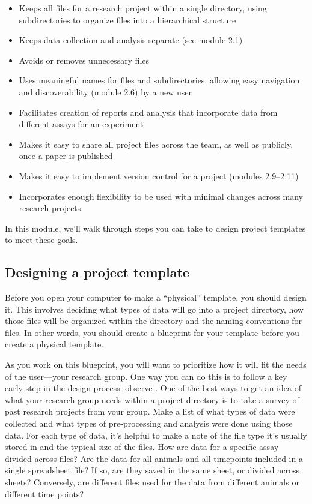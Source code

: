 \documentclass[]{tufte-book}
\providecommand{\tightlist}{%
  \setlength{\itemsep}{0pt}\setlength{\parskip}{0pt}}
\begin{document}
\begin{itemize}
\tightlist
\item
  Keeps all files for a research project within a single directory, using
  subdirectories to organize files into a hierarchical structure
\item
  Keeps data collection and analysis separate (see module 2.1)
\item
  Avoids or removes unnecessary files
\item
  Uses meaningful names for files and subdirectories, allowing easy navigation
  and discoverability (module 2.6) by a new user
\item
  Facilitates creation of reports and analysis that incorporate data from
  different assays for an experiment
\item
  Makes it easy to share all project files across the team, as well as
  publicly, once a paper is published
\item
  Makes it easy to implement version control for a project (modules 2.9--2.11)
\item
  Incorporates enough flexibility to be used with minimal changes across many
  research projects
\end{itemize}

In this module, we'll walk through steps you can take to design project
templates to meet these goals.

\subsection{Designing a project template}\label{designing-a-project-template}

Before you open your computer to make a ``physical'' template, you should design
it. This involves deciding what types of data will go into a project directory,
how those files will be organized within the directory and the naming conventions
for files. In other words, you should create a blueprint for
your template before you create a physical template.

As you work on this blueprint, you will want to prioritize how it will fit the
needs of the user---your research group. One way you can do this is to follow a
key early step in the design process: observe \citep{osann2020design}. One of the
best ways to get an idea of what your research group needs within a project
directory is to take a survey of past research projects from your group. Make a
list of what types of data were collected and what types of pre-processing and
analysis were done using those data. For each type of data, it's helpful to make
a note of the file type it's usually stored in and the typical size of the
files. How are data for a specific assay divided across files? Are the data for
all animals and all timepoints included in a single spreadsheet file? If so, are
they saved in the same sheet, or divided across sheets? Conversely, are
different files used for the data from different animals or different time
points?
\end{document}
